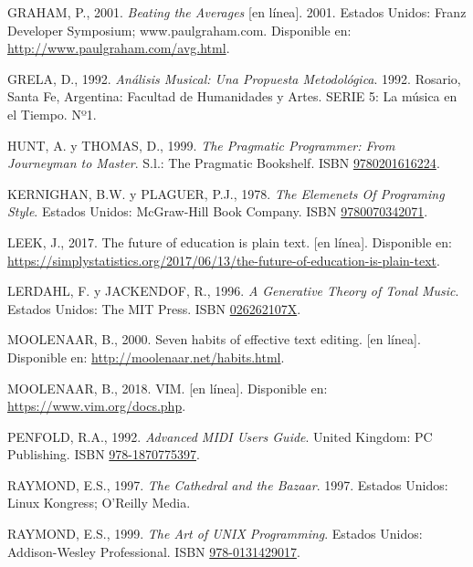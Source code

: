 \documentclass[]{article}
\begin{document}
\leavevmode\hypertarget{ref-graham2}{}%
GRAHAM, P., 2001. \emph{Beating the Averages} {[}en línea{]}. 2001.
Estados Unidos: Franz Developer Symposium; www.paulgraham.com.
Disponible en: \url{http://www.paulgraham.com/avg.html}.

\leavevmode\hypertarget{ref-grela}{}%
GRELA, D., 1992. \emph{Análisis Musical: Una Propuesta Metodológica}.
1992. Rosario, Santa Fe, Argentina: Facultad de Humanidades y Artes.
SERIE 5: La música en el Tiempo. Nº1.

\leavevmode\hypertarget{ref-hunt}{}%
HUNT, A. y THOMAS, D., 1999. \emph{The Pragmatic Programmer: From
Journeyman to Master}. S.l.: The Pragmatic Bookshelf. ISBN
\href{https://worldcat.org/isbn/9780201616224}{9780201616224}.

\leavevmode\hypertarget{ref-kernighan}{}%
KERNIGHAN, B.W. y PLAGUER, P.J., 1978. \emph{The Elemenets Of Programing
Style}. Estados Unidos: McGraw-Hill Book Company. ISBN
\href{https://worldcat.org/isbn/9780070342071}{9780070342071}.

\leavevmode\hypertarget{ref-leek}{}%
LEEK, J., 2017. The future of education is plain text. {[}en línea{]}.
Disponible en:
\url{https://simplystatistics.org/2017/06/13/the-future-of-education-is-plain-text}.

\leavevmode\hypertarget{ref-lerdahl}{}%
LERDAHL, F. y JACKENDOF, R., 1996. \emph{A Generative Theory of Tonal
Music}. Estados Unidos: The MIT Press. ISBN
\href{https://worldcat.org/isbn/026262107X}{026262107X}.

\leavevmode\hypertarget{ref-moolenaar}{}%
MOOLENAAR, B., 2000. Seven habits of effective text editing. {[}en
línea{]}. Disponible en: \url{http://moolenaar.net/habits.html}.

\leavevmode\hypertarget{ref-vim}{}%
MOOLENAAR, B., 2018. VIM. {[}en línea{]}. Disponible en:
\url{https://www.vim.org/docs.php}.

\leavevmode\hypertarget{ref-penfold}{}%
PENFOLD, R.A., 1992. \emph{Advanced MIDI Users Guide}. United Kingdom:
PC Publishing. ISBN
\href{https://worldcat.org/isbn/978-1870775397}{978-1870775397}.

\leavevmode\hypertarget{ref-raymond2}{}%
RAYMOND, E.S., 1997. \emph{The Cathedral and the Bazaar}. 1997. Estados
Unidos: Linux Kongress; O'Reilly Media.

\leavevmode\hypertarget{ref-raymond}{}%
RAYMOND, E.S., 1999. \emph{The Art of UNIX Programming}. Estados Unidos:
Addison-Wesley Professional. ISBN
\href{https://worldcat.org/isbn/978-0131429017}{978-0131429017}.
\end{document}
